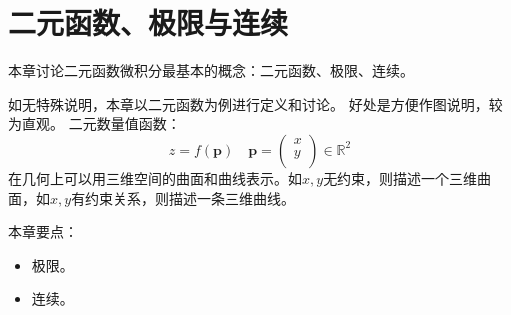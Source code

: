 \chapter{二元函数、极限与连续}

本章讨论二元函数微积分最基本的概念：二元函数、极限、连续。

如无特殊说明，本章以二元函数为例进行定义和讨论。
好处是方便作图说明，较为直观。
二元数量值函数：
\[
z=f\left( \boldsymbol{p} \right) \quad \boldsymbol{p}=\left( \begin{array}{c}
	x\\
	y\\
\end{array} \right) \in \mathbb{R} ^2
\]
在几何上可以用三维空间的曲面和曲线表示。如$x,y$无约束，则描述一个三维曲面，如$x,y$有约束关系，则描述一条三维曲线。

本章要点：
\begin{itemize}
    \item 极限。
    \item 连续。
\end{itemize}

~

\newpage


\newpage


\newpage


\newpage


\newpage


\newpage





